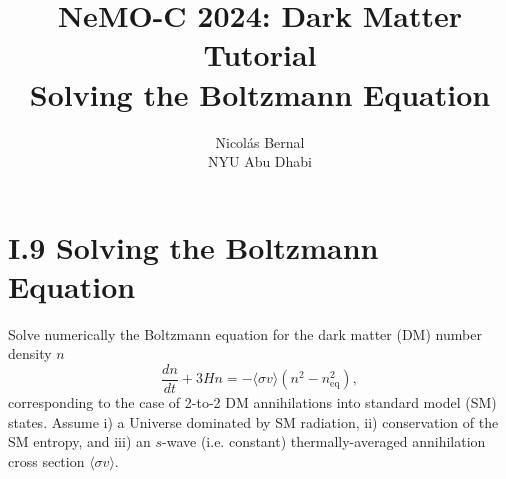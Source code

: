 \documentclass[11pt,a4paper]{article}
\title{\textbf{NeMO-C 2024: Dark Matter Tutorial}\\ \Large Solving the Boltzmann Equation}
\author{Nicolás Bernal \\ NYU Abu Dhabi}
\date{}
\begin{document}
\maketitle

\section*{I.9 Solving the Boltzmann Equation}

Solve numerically the Boltzmann equation for the dark matter (DM) number density $n$
\begin{equation} 
\label{eq:I.15}
    \frac{dn}{dt} + 3 H n = -\langle \sigma v \rangle \left( n^2 - n_{\text{eq}}^2 \right),
\end{equation}
corresponding to the case of 2-to-2 DM annihilations into standard model (SM) states. Assume i) a Universe dominated by SM radiation, ii) conservation of the SM entropy, and iii) an $s$-wave (i.e. constant) thermally-averaged annihilation cross section $\langle \sigma v \rangle$.
\end{document}
